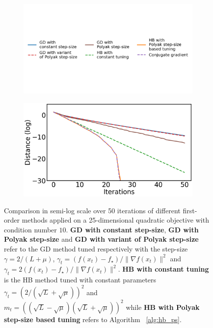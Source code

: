 \documentclass{article}
\begin{document}
    \begin{figure}[ht]
        \centering
        \begin{subfigure}[c]{.9\textwidth}
            \centering
            \includegraphics[trim={0 6.5cm 0 7.5cm},clip, width=\linewidth]{figures/quad_short/kappa_10_d_25_legend.png}
        \end{subfigure}
        \begin{subfigure}[l]{.75\textwidth}
            \centering
            \includegraphics[width=\linewidth]{figures/quad_short/kappa_10_d_25_distances.png}
        \end{subfigure}
        \caption{Comparison in semi-log scale over 50 iterations of different first-order methods applied on a 25-dimensional quadratic objective with condition number $10$. \textbf{GD with constant step-size}, \textbf{GD with Polyak step-size} and \textbf{GD with variant of Polyak step-size} refer to the GD method tuned respectively with the step-size $\gamma = 2 / (L+\mu)$, $\gamma_t = (f(x_t) - f_\star) / \|\nabla f(x_t)\|^2$ and $\gamma_t =   2(f(x_t) - f_\star) / \|\nabla f(x_t)\|^2$. \textbf{HB with constant tuning} is the HB method tuned with constant parameters $\gamma_t = (2 / (\sqrt{L} + \sqrt{\mu}))^2$ and $m_t=((\sqrt{L} - \sqrt{\mu})(\sqrt{L} + \sqrt{\mu}))^2$ while \textbf{HB with Polyak step-size based tuning} refers to Algorithm ~\ref{alg:hb_ps}.}
        \label{fig:quad_short}
    \end{figure}
\end{document}
